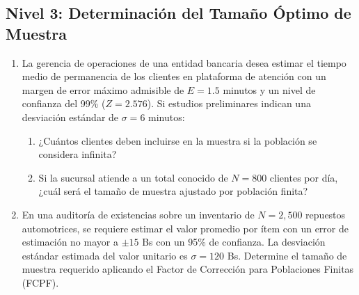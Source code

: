 \subsection*{Nivel 3: Determinación del Tamaño Óptimo de Muestra}
\begin{enumerate}[resume]
    \item La gerencia de operaciones de una entidad bancaria desea estimar el tiempo medio de permanencia de los clientes en plataforma de atención con un margen de error máximo admisible de $E = 1.5$ minutos y un nivel de confianza del 99\% ($Z = 2.576$). Si estudios preliminares indican una desviación estándar de $\sigma = 6$ minutos:
    \begin{enumerate}[label=\alph*)]
        \item ¿Cuántos clientes deben incluirse en la muestra si la población se considera infinita?
        \item Si la sucursal atiende a un total conocido de $N = 800$ clientes por día, ¿cuál será el tamaño de muestra ajustado por población finita?
    \end{enumerate}
    \item En una auditoría de existencias sobre un inventario de $N = 2{,}500$ repuestos automotrices, se requiere estimar el valor promedio por ítem con un error de estimación no mayor a $\pm 15$ Bs con un 95\% de confianza. La desviación estándar estimada del valor unitario es $\sigma = 120$ Bs. Determine el tamaño de muestra requerido aplicando el Factor de Corrección para Poblaciones Finitas (FCPF).
\end{enumerate}

